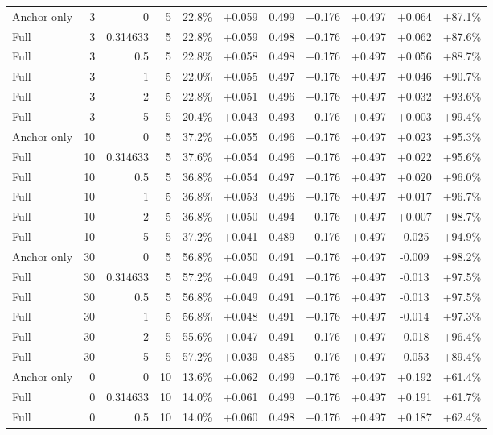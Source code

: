 \begin{table}[htbp]
\begin{tabular}{lrrrccccccc}
Anchor only & 3 & 0 & 5 & 22.8\% & +0.059 & 0.499 & +0.176 & +0.497 & +0.064 & +87.1\% \\
Full & 3 & 0.314633 & 5 & 22.8\% & +0.059 & 0.498 & +0.176 & +0.497 & +0.062 & +87.6\% \\
Full & 3 & 0.5 & 5 & 22.8\% & +0.058 & 0.498 & +0.176 & +0.497 & +0.056 & +88.7\% \\
Full & 3 & 1 & 5 & 22.0\% & +0.055 & 0.497 & +0.176 & +0.497 & +0.046 & +90.7\% \\
Full & 3 & 2 & 5 & 22.8\% & +0.051 & 0.496 & +0.176 & +0.497 & +0.032 & +93.6\% \\
Full & 3 & 5 & 5 & 20.4\% & +0.043 & 0.493 & +0.176 & +0.497 & +0.003 & +99.4\% \\
Anchor only & 10 & 0 & 5 & 37.2\% & +0.055 & 0.496 & +0.176 & +0.497 & +0.023 & +95.3\% \\
Full & 10 & 0.314633 & 5 & 37.6\% & +0.054 & 0.496 & +0.176 & +0.497 & +0.022 & +95.6\% \\
Full & 10 & 0.5 & 5 & 36.8\% & +0.054 & 0.497 & +0.176 & +0.497 & +0.020 & +96.0\% \\
Full & 10 & 1 & 5 & 36.8\% & +0.053 & 0.496 & +0.176 & +0.497 & +0.017 & +96.7\% \\
Full & 10 & 2 & 5 & 36.8\% & +0.050 & 0.494 & +0.176 & +0.497 & +0.007 & +98.7\% \\
Full & 10 & 5 & 5 & 37.2\% & +0.041 & 0.489 & +0.176 & +0.497 & -0.025 & +94.9\% \\
Anchor only & 30 & 0 & 5 & 56.8\% & +0.050 & 0.491 & +0.176 & +0.497 & -0.009 & +98.2\% \\
Full & 30 & 0.314633 & 5 & 57.2\% & +0.049 & 0.491 & +0.176 & +0.497 & -0.013 & +97.5\% \\
Full & 30 & 0.5 & 5 & 56.8\% & +0.049 & 0.491 & +0.176 & +0.497 & -0.013 & +97.5\% \\
Full & 30 & 1 & 5 & 56.8\% & +0.048 & 0.491 & +0.176 & +0.497 & -0.014 & +97.3\% \\
Full & 30 & 2 & 5 & 55.6\% & +0.047 & 0.491 & +0.176 & +0.497 & -0.018 & +96.4\% \\
Full & 30 & 5 & 5 & 57.2\% & +0.039 & 0.485 & +0.176 & +0.497 & -0.053 & +89.4\% \\
Anchor only & 0 & 0 & 10 & 13.6\% & +0.062 & 0.499 & +0.176 & +0.497 & +0.192 & +61.4\% \\
Full & 0 & 0.314633 & 10 & 14.0\% & +0.061 & 0.499 & +0.176 & +0.497 & +0.191 & +61.7\% \\
Full & 0 & 0.5 & 10 & 14.0\% & +0.060 & 0.498 & +0.176 & +0.497 & +0.187 & +62.4\% \\

\end{tabular}
\end{table}

